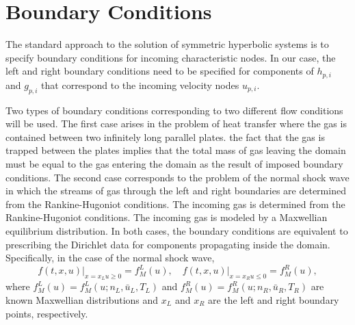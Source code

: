 \section{Boundary Conditions}
The standard approach to the solution of symmetric hyperbolic systems is to specify boundary conditions for incoming characteristic nodes. In our case, the left and right boundary conditions need to be specified for components of $h_{p,i}$ and $g_{p,i}$ that correspond to the incoming velocity nodes $u_{p,i}$.

Two types of boundary conditions corresponding to two different flow conditions will be used. The first case arises in the problem of heat transfer where the gas is contained between two infinitely long parallel plates. the fact that the gas is trapped between the plates implies that the total mass of gas leaving the domain must be equal to the gas entering the domain as the result of imposed boundary conditions. The second case corresponds to the problem of the normal shock wave in which the streams of gas through the left and right boundaries are determined from the Rankine-Hugoniot conditions. The incoming gas is determined from the Rankine-Hugoniot conditions. The incoming gas is  modeled by a Maxwellian equilibrium distribution. In both cases, the boundary conditions are equivalent to prescribing the Dirichlet data for components propagating inside the domain. Specifically, in the case of the normal shock wave,
%
\begin{equation}
\label{bc01}
f(t,x,u)\Big|_{{x=x_{L}} {u\ge 0}} = f^{L}_{M}(u), \quad
f(t,x,u)\Big|_{{x=x_{R}} {u\le 0}} = f^{R}_{M}(u),
\end{equation}
%
where $f^{L}_{M}(u)=f^{L}_{M}(u;n_{L},\bar{u}_{L},T_{L})$ and $f^{R}_{M}(u)=f^{R}_{M}(u;n_{R},\bar{u}_{R},T_{R})$ are known Maxwellian distributions and $x_{L}$ and $x_{R}$ are the left and right boundary points, respectively.

